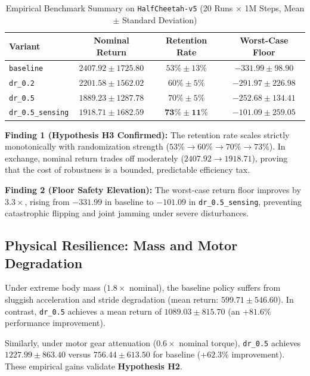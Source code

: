 \documentclass[conference]{IEEEtran}
\begin{document}
\begin{table}[h]
\caption{Empirical Benchmark Summary on \texttt{HalfCheetah-v5} (20 Runs $\times$ 1M Steps, Mean $\pm$ Standard Deviation)}
\label{tab:summary}
\centering
\begin{tabular}{lccc}
\toprule
\textbf{Variant} & \textbf{Nominal Return} & \textbf{Retention Rate} & \textbf{Worst-Case Floor} \\
\midrule
\texttt{baseline} & $\mathbf{2407.92 \pm 1725.80}$ & $53\% \pm 13\%$ & $-331.99 \pm 98.90$ \\
\texttt{dr\_0.2} & $2201.58 \pm 1562.02$ & $60\% \pm 5\%$ & $-291.97 \pm 226.98$ \\
\texttt{dr\_0.5} & $1889.23 \pm 1287.78$ & $70\% \pm 5\%$ & $-252.68 \pm 134.41$ \\
\texttt{dr\_0.5\_sensing} & $1918.71 \pm 1682.59$ & $\mathbf{73\% \pm 11\%}$ & $\mathbf{-101.09 \pm 259.05}$ \\
\bottomrule
\end{tabular}
\end{table}

\textbf{Finding 1 (Hypothesis H3 Confirmed):} The retention rate scales strictly monotonically with randomization strength ($53\% \rightarrow 60\% \rightarrow 70\% \rightarrow 73\%$). In exchange, nominal return trades off moderately ($2407.92 \rightarrow 1918.71$), proving that the cost of robustness is a bounded, predictable efficiency tax.

\textbf{Finding 2 (Floor Safety Elevation):} The worst-case return floor improves by $3.3\times$, rising from $-331.99$ in baseline to $-101.09$ in \texttt{dr\_0.5\_sensing}, preventing catastrophic flipping and joint jamming under severe disturbances.

\subsection{Physical Resilience: Mass and Motor Degradation}
Under extreme body mass ($1.8\times$ nominal), the baseline policy suffers from sluggish acceleration and stride degradation (mean return: $599.71 \pm 546.60$). In contrast, \texttt{dr\_0.5} achieves a mean return of $\mathbf{1089.03 \pm 815.70}$ (an $\mathbf{+81.6\%}$ performance improvement).

Similarly, under motor gear attenuation ($0.6\times$ nominal torque), \texttt{dr\_0.5} achieves $1227.99 \pm 863.40$ versus $756.44 \pm 613.50$ for baseline ($+\mathbf{62.3\%}$ improvement). These empirical gains validate \textbf{Hypothesis H2}.
\end{document}
